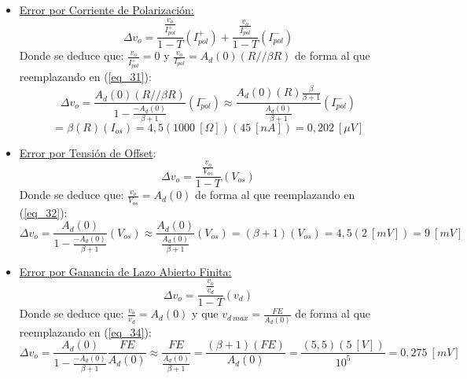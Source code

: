 \documentclass[12pt,a4paper]{article}
\begin{document}
\begin{itemize}
    \item \underline{Error por Corriente de Polarización:}
    \begin{equation}
        \label{eq_29}
        \Delta v_{o} = \frac{\frac{v_o}{I_{pol}^+}}{1-T}(I_{pol}^+) + \frac{\frac{v_o}{I_{pol}^-}}{1-T}(I_{pol}^-)
    \end{equation}
    Donde se deduce que: $\frac{v_o}{I_{pol}^+}=0$ y $\frac{v_o}{I_{pol}^-}=A_{d}(0)(R//\beta R)$ de forma al que reemplazando en (\ref{eq_31}):
    \begin{equation}
        \label{eq_30}
        \Delta v_{o} = \frac{A_{d}(0)(R//\beta R)}{1-\frac{-A_{d}(0)}{\beta+1}}(I_{pol}^-) \approx \frac{A_{d}(0)(R)\frac{\beta}{\beta+1}}{\frac{A_{d}(0)}{\beta+1}} (I_{pol}^-)
    \end{equation}
    \begin{equation}
        \label{eq_31}
        =\beta(R)(I_{os})=4,5(1000 \ [\Omega])(45 \ [nA]) = 0,202 \ [\mu V]
    \end{equation}
    
    \item \underline{Error por Tensión de Offset}:
    \begin{equation}
        \label{eq_32}
        \Delta v_{o} = \frac{\frac{v_o}{V_{os}}}{1-T}(V_{os})
    \end{equation}
    Donde se deduce que: $\frac{v_o}{V_{os}}=A_{d}(0)$ de forma al que reemplazando en (\ref{eq_32}):
    \begin{equation}
        \label{eq_33}
        \Delta v_{o} = \frac{A_{d}(0)}{1-\frac{-A_{d}(0)}{\beta+1}}(V_{os}) \approx \frac{A_{d}(0)}{\frac{A_{d}(0)}{\beta+1}}(V_{os})=(\beta+1)(V_{os})=4,5(2 \ [mV]) = 9 \ [mV]
    \end{equation}

    \item \underline{Error por Ganancia de Lazo Abierto Finita:}
    \begin{equation}
        \label{eq_34}
        \Delta v_{o} = \frac{\frac{v_o}{v_{d}}}{1-T}(v_{d})
    \end{equation}
    Donde se deduce que: $\frac{v_o}{v_{d}}=A_{d}(0)$ y que $v_{d \ max}=\frac{FE}{A_{d}(0)}$ de forma al que reemplazando en (\ref{eq_34}):
    \begin{equation}
        \label{eq_35}
        \Delta v_{o} = \frac{A_{d}(0)}{1-\frac{-A_{d}(0)}{\beta+1}} \frac{FE}{A_{d}(0)} \approx \frac{FE}{\frac{A_{d}(0)}{\beta+1}}=\frac{(\beta+1)(FE)}{A_{d}(0)}= \frac{(5,5)(5 \ [V])}{10^5} = 0,275 \ [mV]
    \end{equation}


\end{itemize}
\end{document}
